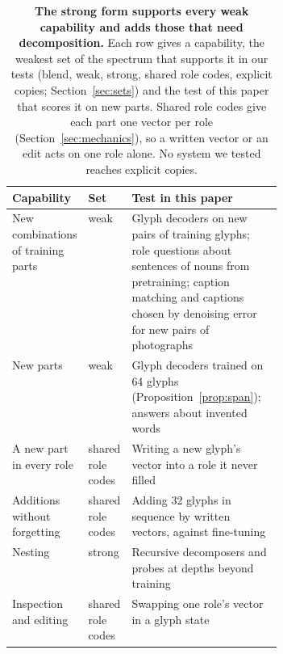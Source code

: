 \begin{table}[t]
  \caption{\textbf{The strong form supports every weak capability and adds those that need decomposition.} Each row gives a capability, the weakest set of the spectrum that supports it in our tests (blend, weak, strong, shared role codes, explicit copies; Section~\ref{sec:sets}) and the test of this paper that scores it on new parts. Shared role codes give each part one vector per role (Section~\ref{sec:mechanics}), so a written vector or an edit acts on one role alone. No system we tested reaches explicit copies.}
  \label{tab:capabilities}
  \centering\small
  \begin{tabularx}{\linewidth}{@{}P{0.25\linewidth}P{0.14\linewidth}Y@{}}
    \toprule
    Capability & Set & Test in this paper \\
    \midrule
    New combinations of training parts & weak & Glyph decoders on new pairs of training glyphs; role questions about sentences of nouns from pretraining; caption matching and captions chosen by denoising error for new pairs of photographs \\
    New parts & weak & Glyph decoders trained on 64 glyphs (Proposition~\ref{prop:span}); answers about invented words \\
    A new part in every role & shared role codes & Writing a new glyph's vector into a role it never filled \\
    Additions without forgetting & shared role codes & Adding 32 glyphs in sequence by written vectors, against fine-tuning \\
    Nesting & strong & Recursive decomposers and probes at depths beyond training \\
    Inspection and editing & shared role codes & Swapping one role's vector in a glyph state \\
    \bottomrule
  \end{tabularx}
\end{table}
